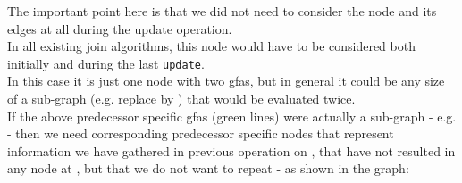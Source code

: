 The important point here is that we did not need to consider the node  and its edges at all during the update operation.\\
In all existing join algorithms, this node would have to be considered both initially and during the last \lstinline{update}.\\
In this case it is just one node with two gfas, but in general it could be any size of a sub-graph (e.g. replace  by  ) that would be evaluated twice.\\
If the above predecessor specific gfas (green lines) were actually a sub-graph - e.g.  - then we need corresponding 
predecessor specific nodes that represent information we have gathered in previous operation on , that have not resulted in any node
at , but that we do not want to repeat - as shown in the graph:
